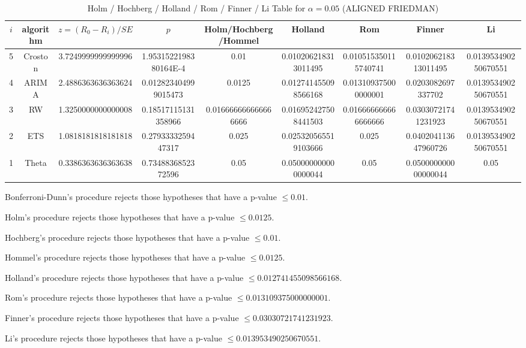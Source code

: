 \documentclass[a4paper,10pt]{article}
\begin{document}
\begin{landscape}
\begin{table}[!htp]
\centering\scriptsize
\caption{Holm / Hochberg / Holland / Rom / Finner / Li Table for $\alpha=0.05$ (ALIGNED FRIEDMAN)}
\begin{tabular}{ccccccccc}
$i$&algorithm&$z=(R_0 - R_i)/SE$&$p$&Holm/Hochberg/Hommel&Holland&Rom&Finner&Li\\
\hline
5&Croston&3.7249999999999996&1.9531522198380164E-4&0.01&0.010206218313011495&0.010515350115740741&0.010206218313011495&0.013953490250670551\\
4&ARIMA&2.4886363636363624&0.012823404999015473&0.0125&0.012741455098566168&0.013109375000000001&0.0203082697337702&0.013953490250670551\\
3&RW&1.3250000000000008&0.18517115131358966&0.016666666666666666&0.016952427508441503&0.016666666666666666&0.03030721741231923&0.013953490250670551\\
2&ETS&1.0818181818181818&0.2793333259447317&0.025&0.025320565519103666&0.025&0.040204113647960726&0.013953490250670551\\
1&Theta&0.3386363636363638&0.7348836852372596&0.05&0.050000000000000044&0.05&0.050000000000000044&0.05\\
\hline
\end{tabular}
\end{table}
Bonferroni-Dunn's procedure rejects those hypotheses that have a p-value $\le0.01$.


Holm's procedure rejects those hypotheses that have a p-value $\le0.0125$.


Hochberg's procedure rejects those hypotheses that have a p-value $\le0.01$.


Hommel's procedure rejects those hypotheses that have a p-value $\le0.0125$.


Holland's procedure rejects those hypotheses that have a p-value $\le0.012741455098566168$.


Rom's procedure rejects those hypotheses that have a p-value $\le0.013109375000000001$.


Finner's procedure rejects those hypotheses that have a p-value $\le0.03030721741231923$.


Li's procedure rejects those hypotheses that have a p-value $\le0.013953490250670551$.



\newpage


\end{landscape}
\end{document}
